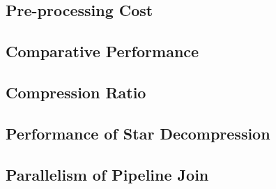 \subsection{Pre-processing Cost}
\subsection{Comparative Performance}
\subsection{Compression Ratio}
\subsection{Performance of Star Decompression}
\subsection{Parallelism of Pipeline Join}
